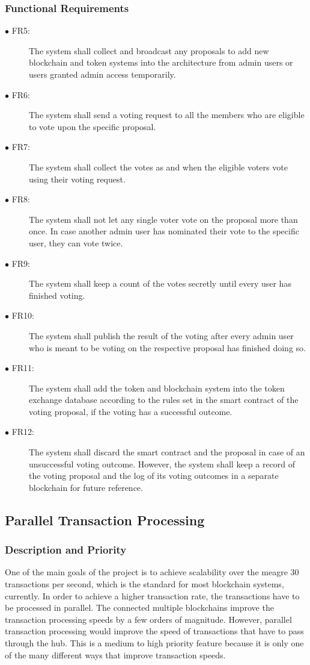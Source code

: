 \documentclass[a4paper,twoside,phd]{BYUPhys}
\begin{document}
\subsubsection{Functional Requirements}
\begin{description}
\item[$\bullet$ FR5:] The system shall collect and broadcast any proposals to add new blockchain and token systems into the architecture from admin users or users granted admin access temporarily.
\item[$\bullet$ FR6:] The system shall send a voting request to all the members who are eligible to vote upon the specific proposal.
\item[$\bullet$ FR7:] The system shall collect the votes as and when the eligible voters vote using their voting request.
\item[$\bullet$ FR8:] The system shall not let any single voter vote on the proposal more than once. In case another admin user has nominated their vote to the specific user, they can vote twice.
\item[$\bullet$ FR9:] The system shall keep a count of the votes secretly until every user has finished voting.
\item[$\bullet$ FR10:] The system shall publish the result of the voting after every admin user who is meant to be voting on the respective proposal has finished doing so.
\item[$\bullet$ FR11:] The system shall add the token and blockchain system into the token exchange database according to the rules set in the smart contract of the voting proposal, if the voting has a successful outcome.
\item[$\bullet$ FR12:] The system shall discard the smart contract and the proposal in case of an unsuccessful voting outcome. However, the system shall keep a record of the voting proposal and the log of its voting outcomes in a separate blockchain for future reference.
\end{description}
\subsection{Parallel Transaction Processing}
\subsubsection{Description and Priority}
One of the main goals of the project is to achieve scalability over the meagre 30 transactions per second, which is the standard for most blockchain systems, currently. In order to achieve a higher transaction rate, the transactions have to be processed in parallel. The connected multiple blockchains improve the transaction processing speeds by a few orders of magnitude. However, parallel transaction processing would improve the speed of transactions that have to pass through the hub. This is a medium to high priority feature because it is only one of the many different ways that improve transaction speeds. 
\end{document}
